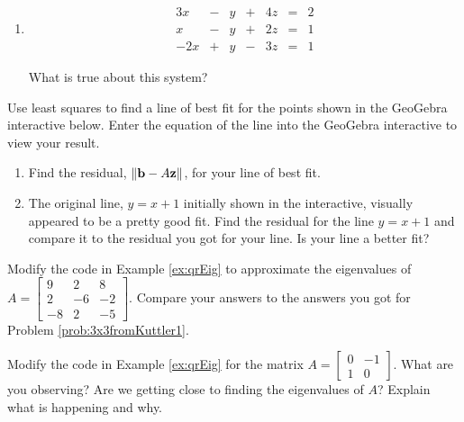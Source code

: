 \documentclass{ximera}
\begin{document}
\begin{problem}
\begin{enumerate}
    \item 
    \begin{equation}
\begin{array}{ccccccccc}
      3x &- &y&+&4z&= &2 \\
	 x&-&y&+&2z&=&1\\
     -2x&+&y&-&3z&=&1
    \end{array}
    \end{equation}

    What is true about this system?
    \begin{multipleChoice}
    \end{multipleChoice}

         \end{enumerate}
\end{problem}

\begin{problem}\label{prob_oct_lineFit}
  Use least squares to find a line of best fit for the points shown in the GeoGebra interactive below. 
  Enter the equation of the line into the GeoGebra interactive to view your result.

  \begin{center}
  \end{center}
  
  \begin{enumerate}
    \item Find the residual, $\left\lVert\mathbf{b}-A\mathbf{z}\right\rVert$, for your line of best fit.  
    \item The original line, $y=x+1$ initially shown in the interactive, visually appeared to be a pretty good fit.  Find the residual for the line $y=x+1$ and compare it to the residual you got for your line.  Is your line a better fit?
  \end{enumerate}
\end{problem}

\begin{problem}\label{prob_oct_qr1}
Modify the code in Example \ref{ex:qrEig} to approximate the eigenvalues of $A=\begin{bmatrix} 9 & 2 & 8\\ 2 & -6 & -2\\ -8 & 2 & -5\end{bmatrix}$.  Compare your answers to the answers you got for Problem \ref{prob:3x3fromKuttler1}. 
\end{problem}

\begin{problem}\label{prob_oct_qr2}
  Modify the code in Example \ref{ex:qrEig} for the matrix $A=\begin{bmatrix} 0 & -1\\ 1 & 0 \end{bmatrix}$.  What are you observing?  Are we getting close to finding the eigenvalues of $A$?  Explain what is happening and why.
  \end{problem}
\end{document}
